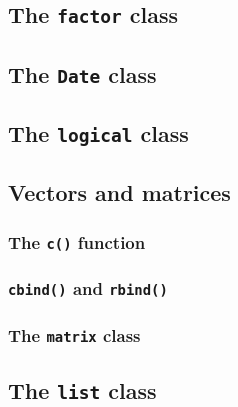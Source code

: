 \documentclass[]{gitbook}
\begin{document}
\hypertarget{the-factor-class}{%
\subsection{\texorpdfstring{The \texttt{factor} class}{The factor class}}\label{the-factor-class}}

\hypertarget{the-date-class}{%
\subsection{\texorpdfstring{The \texttt{Date} class}{The Date class}}\label{the-date-class}}

\hypertarget{the-logical-class}{%
\subsection{\texorpdfstring{The \texttt{logical} class}{The logical class}}\label{the-logical-class}}

\hypertarget{vectors-and-matrices}{%
\subsection{Vectors and matrices}\label{vectors-and-matrices}}

\hypertarget{the-c-function}{%
\subsubsection{\texorpdfstring{The \texttt{c()} function}{The c() function}}\label{the-c-function}}

\hypertarget{cbind-and-rbind}{%
\subsubsection{\texorpdfstring{\texttt{cbind()} and \texttt{rbind()}}{cbind() and rbind()}}\label{cbind-and-rbind}}

\hypertarget{the-matrix-class}{%
\subsubsection{\texorpdfstring{The \texttt{matrix} class}{The matrix class}}\label{the-matrix-class}}

\hypertarget{the-list-class}{%
\subsection{\texorpdfstring{The \texttt{list} class}{The list class}}\label{the-list-class}}
\end{document}
